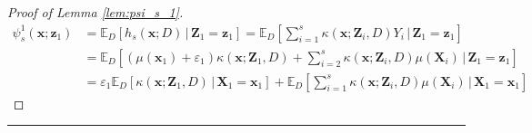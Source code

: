 \documentclass[letterpaper,10pt]{article}
\numberwithin{equation}{section}
\numberwithin{thm}{section}
\newtheorem{lem}{Lemma}
\numberwithin{lem}{section}
\numberwithin{cor}{section}
\newcommand{\E}{\mathbb{E}}
\newcommand{\1}{\mathbbm{1}}
\newcommand{\indep}{\perp\!\!\!\!\perp}
\begin{document}
\begin{proof}[Proof of Lemma \ref{lem:psi_s_1}]
	\begin{equation}
		\begin{aligned}
			\psi_{s}^{1}\left(\mathbf{x}; \mathbf{z}_1\right)
			 & = \E_{D}\left[h_{s}\left(\mathbf{x}; D\right) \, | \, \mathbf{Z}_1 = \mathbf{z}_1 \right]
			= \E_{D}\left[\sum_{i = 1}^{s} \kappa\left(\mathbf{x}; \mathbf{Z}_i, D\right) Y_i \, \Big| \, \mathbf{Z}_1 = \mathbf{z}_1 \right]  \\
			 & = \E_{D}\left[\left(\mu(\mathbf{x}_1) + \varepsilon_1\right)\kappa\left(\mathbf{x}; \mathbf{Z}_1, D\right)
			+ \sum_{i = 2}^{s} \kappa\left(\mathbf{x}; \mathbf{Z}_i, D\right) \mu(\mathbf{X}_i)\, \Big| \, \mathbf{Z}_1 = \mathbf{z}_1 \right] \\
			 & = \varepsilon_1 \E_D\left[\kappa\left(\mathbf{x}; \mathbf{Z}_1, D\right)\, \Big| \, \mathbf{X}_1 = \mathbf{x}_1 \right]
			+ \E_{D}\left[\sum_{i = 1}^{s} \kappa\left(\mathbf{x}; \mathbf{Z}_i, D\right) \mu(\mathbf{X}_i)\, \Big| \, \mathbf{X}_1 = \mathbf{x}_1 \right]
		\end{aligned}
	\end{equation}
\end{proof}

\hrule

\end{document}

